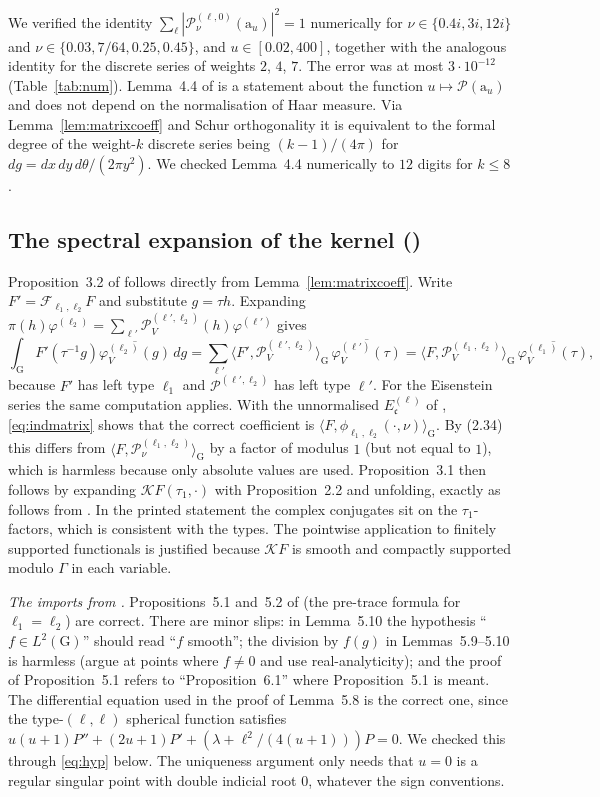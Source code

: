 \documentclass[11pt]{amsart}
\theoremstyle{remark}
\theoremstyle{definition}
\numberwithin{equation}{section}
\newcommand{\G}{\mathrm{G}}
\newcommand{\br}[1]{\langle #1\rangle}
\newcommand{\Pc}{\mathcal{P}}
\newcommand{\Fc}{\mathcal{F}}
\newcommand{\Kc}{\mathcal{K}}
\newcommand{\ra}{\mathrm{a}}
\begin{document}
We verified the identity $\sum_\ell|\Pc_\nu^{(\ell,0)}(\ra_u)|^2=1$ numerically for $\nu\in\{0.4i,3i,12i\}$ and $\nu\in\{0.03,7/64,0.25,0.45\}$, and $u\in[0.02,400]$, together with the analogous identity for the discrete series of weights $2$, $4$, $7$. The error was at most $3\cdot10^{-12}$ (Table~\ref{tab:num}). Lemma~4.4 of \cite{GM1} is a statement about the function $u\mapsto\Pc(\ra_u)$ and does not depend on the normalisation of Haar measure. Via Lemma~\ref{lem:matrixcoeff} and Schur orthogonality it is equivalent to the formal degree of the weight-$k$ discrete series being $(k-1)/(4\pi)$ for $dg=dx\,dy\,d\theta/(2\pi y^2)$. We checked Lemma~4.4 numerically to $12$ digits for $k\le8$.

\subsection{The spectral expansion of the kernel (\texorpdfstring{\cite[\S3]{GM1}}{[GM1, §3]})}\label{sec:pretrace}
Proposition~3.2 of \cite{GM1} follows directly from Lemma~\ref{lem:matrixcoeff}. Write $F'=\Fc_{\ell_1,\ell_2}F$ and substitute $g=\tau h$. Expanding $\pi(h)\varphi^{(\ell_2)}=\sum_{\ell'}\Pc^{(\ell',\ell_2)}_V(h)\varphi^{(\ell')}$ gives
\[
\int_\G F'(\tau^{-1}g)\overline{\varphi_V^{(\ell_2)}(g)}\,dg=\sum_{\ell'}\br{F',\Pc_V^{(\ell',\ell_2)}}_\G\,\overline{\varphi_V^{(\ell')}(\tau)}=\br{F,\Pc_V^{(\ell_1,\ell_2)}}_\G\,\overline{\varphi_V^{(\ell_1)}(\tau)},
\]
because $F'$ has left type $\ell_1$ and $\Pc^{(\ell',\ell_2)}$ has left type $\ell'$. For the Eisenstein series the same computation applies. With the unnormalised $E^{(\ell)}_{\mathfrak c}$ of \cite{GM1}, \eqref{eq:indmatrix} shows that the correct coefficient is $\br{F,\phi_{\ell_1,\ell_2}(\cdot,\nu)}_\G$. By (2.34) this differs from $\br{F,\Pc^{(\ell_1,\ell_2)}_\nu}_\G$ by a factor of modulus $1$ (but not equal to $1$), which is harmless because only absolute values are used. Proposition~3.1 then follows by expanding $\Kc F(\tau_1,\cdot)$ with Proposition~2.2 and unfolding, exactly as \cite[Proposition~5.1]{GM0} follows from \cite[Proposition~5.2]{GM0}. In the printed statement the complex conjugates sit on the $\tau_1$-factors, which is consistent with the types. The pointwise application to finitely supported functionals is justified because $\Kc F$ is smooth and compactly supported modulo $\Gamma$ in each variable.

\emph{The imports from \cite{GM0}.} Propositions~5.1 and~5.2 of \cite{GM0} (the pre-trace formula for $\ell_1=\ell_2$) are correct. There are minor slips: in Lemma~5.10 the hypothesis ``$f\in L^2(\G)$'' should read ``$f$ smooth''; the division by $f(g)$ in Lemmas~5.9--5.10 is harmless (argue at points where $f\ne0$ and use real-analyticity); and the proof of Proposition~5.1 refers to ``Proposition~6.1'' where Proposition~5.1 is meant. The differential equation used in the proof of Lemma~5.8 is the correct one, since the type-$(\ell,\ell)$ spherical function satisfies $u(u+1)P''+(2u+1)P'+(\lambda+\ell^2/(4(u+1)))P=0$. We checked this through \eqref{eq:hyp} below. The uniqueness argument only needs that $u=0$ is a regular singular point with double indicial root $0$, whatever the sign conventions.
\end{document}
